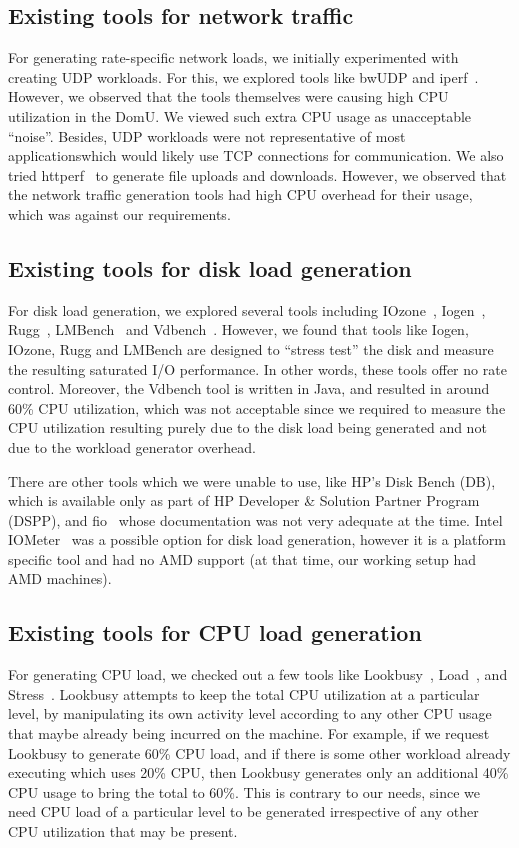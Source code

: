 \subsection{Existing tools for network traffic}
For generating rate-specific network loads, we initially experimented with creating
UDP workloads. 
For this, we explored tools like bwUDP and iperf~\cite{iperf}. 
However, we observed that the tools themselves were causing
high CPU utilization in the DomU. We viewed such extra CPU usage as unacceptable ``noise''.
Besides, UDP workloads were not representative of most applications\textemdash{}which would
likely use TCP connections for communication. 
We also tried httperf~\cite{httperf} to generate file uploads
and downloads. However, we observed that the network traffic generation tools had
high CPU overhead for their usage, which was against our requirements.

\subsection{Existing tools for disk load generation}
For disk load generation, we explored several tools including 
IOzone~\cite{iozone}, Iogen~\cite{iogen}, 
Rugg~\cite{rugg}, LMBench~\cite{lmbench} and Vdbench~\cite{vdbench}.
However, we found that tools like Iogen, IOzone, Rugg and LMBench are designed
to ``stress test'' the disk and measure the resulting saturated I/O performance.
In other words, these tools offer no rate control. Moreover, the
Vdbench tool is written in Java, and resulted in around 60\% CPU 
utilization, which was not
acceptable since we required to measure the 
CPU utilization resulting purely due to the disk load being
generated and not due to the workload generator overhead. 

There are other tools which we were
unable to use, like HP's Disk Bench (DB), which is available only as part of HP Developer \&
Solution Partner Program (DSPP), 
and fio~\cite{fio} whose documentation was not very adequate at the time.
Intel IOMeter~\cite{iometer} was a possible option for disk load generation, 
however it is a platform
specific tool and had no AMD support (at that time, our working setup had AMD machines).

\subsection{Existing tools for CPU load generation}
For generating CPU load, 
we checked out a few tools like Lookbusy~\cite{lookbusy}, Load~\cite{load}, and
Stress~\cite{stress}. Lookbusy attempts to keep the total 
CPU utilization at a particular level, by 
manipulating its own activity level according to any 
other CPU usage that maybe already being incurred
on the machine. 
For example, if we request Lookbusy to generate 60\% CPU load, 
and if there is some other workload already executing which uses 20\% CPU,
then Lookbusy generates only an additional 40\% CPU usage to bring
the total to 60\%.
This is contrary to our needs, since 
we need CPU load of a particular level to
be generated irrespective of any other CPU utilization that may 
be present. 

